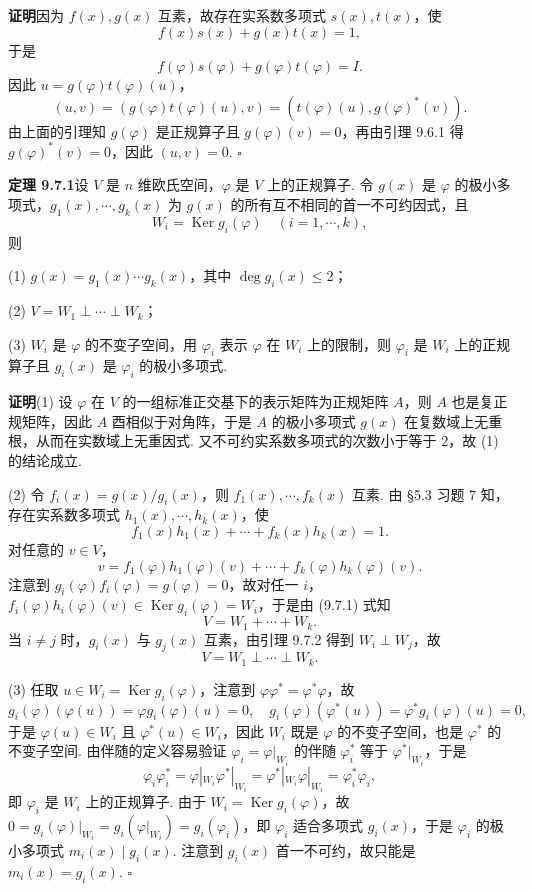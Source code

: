 \documentclass[UTF8, 12pt, fontset=fandol, oneside]{ctexart}
\begin{document}
\noindent\textbf{证明}\quad 因为 $f(x),g(x)$ 互素，故存在实系数多项式 $s(x),t(x)$，使
\[
  f(x)s(x)+g(x)t(x)=1,
\]
于是
\[
  f(\varphi)s(\varphi)+g(\varphi)t(\varphi)=I.
\]
因此 $u=g(\varphi)t(\varphi)(u)$，
\[
  (u,v)=(g(\varphi)t(\varphi)(u),v)=(t(\varphi)(u),g(\varphi)^*(v)).
\]
由上面的引理知 $g(\varphi)$ 是正规算子且 $g(\varphi)(v)=0$，再由引理 9.6.1 得 $g(\varphi)^*(v)=0$，因此 $(u,v)=0$. $\square$

\noindent\textbf{定理 9.7.1}\quad 设 $V$ 是 $n$ 维欧氏空间，$\varphi$ 是 $V$ 上的正规算子. 令 $g(x)$ 是 $\varphi$ 的极小多项式，$g_1(x),\cdots,g_k(x)$ 为 $g(x)$ 的所有互不相同的首一不可约因式，且
\[
  W_i=\operatorname{Ker} g_i(\varphi)\quad (i=1,\cdots,k),
\]
则

(1) $g(x)=g_1(x)\cdots g_k(x)$，其中 $\deg g_i(x)\le 2$；

(2) $V=W_1\perp\cdots\perp W_k$；

(3) $W_i$ 是 $\varphi$ 的不变子空间，用 $\varphi_i$ 表示 $\varphi$ 在 $W_i$ 上的限制，则 $\varphi_i$ 是 $W_i$ 上的正规算子且 $g_i(x)$ 是 $\varphi_i$ 的极小多项式.

\noindent\textbf{证明}\quad (1) 设 $\varphi$ 在 $V$ 的一组标准正交基下的表示矩阵为正规矩阵 $A$，则 $A$ 也是复正规矩阵，因此 $A$ 酉相似于对角阵，于是 $A$ 的极小多项式 $g(x)$ 在复数域上无重根，从而在实数域上无重因式. 又不可约实系数多项式的次数小于等于 $2$，故 (1) 的结论成立.

(2) 令 $f_i(x)=g(x)/g_i(x)$，则 $f_1(x),\cdots,f_k(x)$ 互素. 由 §5.3 习题 7 知，存在实系数多项式 $h_1(x),\cdots,h_k(x)$，使
\[
  f_1(x)h_1(x)+\cdots+f_k(x)h_k(x)=1.
\]
对任意的 $v\in V$，
\begin{equation}
  v=f_1(\varphi)h_1(\varphi)(v)+\cdots+f_k(\varphi)h_k(\varphi)(v).
  \tag{9.7.1}
\end{equation}
注意到 $g_i(\varphi)f_i(\varphi)=g(\varphi)=0$，故对任一 $i$，$f_i(\varphi)h_i(\varphi)(v)\in\operatorname{Ker} g_i(\varphi)=W_i$，于是由 (9.7.1) 式知
\[
  V=W_1+\cdots+W_k.
\]
当 $i\ne j$ 时，$g_i(x)$ 与 $g_j(x)$ 互素，由引理 9.7.2 得到 $W_i\perp W_j$，故
\[
  V=W_1\perp\cdots\perp W_k.
\]

(3) 任取 $u\in W_i=\operatorname{Ker}g_i(\varphi)$，注意到 $\varphi\varphi^*=\varphi^*\varphi$，故
\[
  g_i(\varphi)(\varphi(u))=\varphi g_i(\varphi)(u)=0,\quad
  g_i(\varphi)(\varphi^*(u))=\varphi^*g_i(\varphi)(u)=0,
\]
于是 $\varphi(u)\in W_i$ 且 $\varphi^*(u)\in W_i$，因此 $W_i$ 既是 $\varphi$ 的不变子空间，也是 $\varphi^*$ 的不变子空间. 由伴随的定义容易验证 $\varphi_i=\varphi|_{W_i}$ 的伴随 $\varphi_i^*$ 等于 $\varphi^*|_{W_i}$，于是
\[
  \varphi_i\varphi_i^*=\varphi|_{W_i}\varphi^*|_{W_i}
  =\varphi^*|_{W_i}\varphi|_{W_i}=\varphi_i^*\varphi_i,
\]
即 $\varphi_i$ 是 $W_i$ 上的正规算子. 由于 $W_i=\operatorname{Ker}g_i(\varphi)$，故 $0=g_i(\varphi)|_{W_i}=g_i(\varphi|_{W_i})=g_i(\varphi_i)$，即 $\varphi_i$ 适合多项式 $g_i(x)$，于是 $\varphi_i$ 的极小多项式 $m_i(x)\mid g_i(x)$. 注意到 $g_i(x)$ 首一不可约，故只能是 $m_i(x)=g_i(x)$. $\square$
\end{document}
